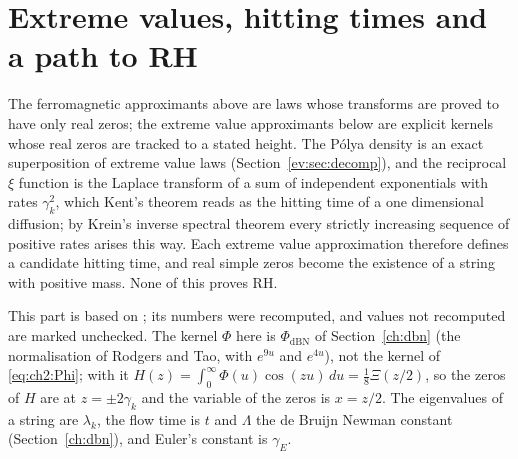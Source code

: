 \section*{Extreme values, hitting times and a path to RH}\label{chap:evt}\label{ch:evt}

The ferromagnetic approximants above are laws whose transforms are proved to have only real zeros; the extreme value approximants below are explicit kernels whose real zeros are tracked to a stated height. The P\'olya density is an exact superposition of extreme value laws (Section~\ref{ev:sec:decomp}), and the reciprocal $\xi$ function is the Laplace transform of a sum of independent exponentials with rates $\gamma_k^2$, which Kent's theorem reads as the hitting time of a one dimensional diffusion; by Krein's inverse spectral theorem every strictly increasing sequence of positive rates arises this way. Each extreme value approximation therefore defines a candidate hitting time, and real simple zeros become the existence of a string with positive mass. None of this proves RH.

This part is based on \cite{P26evt}; its numbers were recomputed, and values not recomputed are marked unchecked. The kernel $\Phi$ here is $\Phi_{\mathrm{dBN}}$ of Section~\ref{ch:dbn} (the normalisation of Rodgers and Tao, with $e^{9u}$ and $e^{4u}$), not the kernel of \eqref{eq:ch2:Phi}; with it $H(z)=\int_0^\infty\Phi(u)\cos(zu)\,du=\tfrac18\Xi(z/2)$, so the zeros of $H$ are at $z=\pm2\gamma_k$ and the variable of the zeros is $x=z/2$. The eigenvalues of a string are $\lambda_k$, the flow time is $t$ and $\Lambda$ the de Bruijn Newman constant (Section~\ref{ch:dbn}), and Euler's constant is $\gamma_E$.

